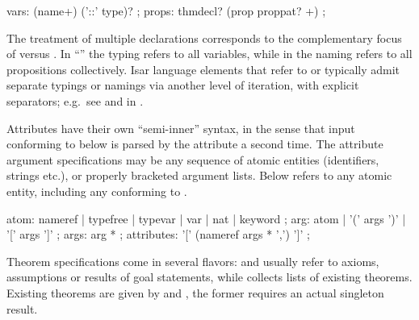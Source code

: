 \begin{isabellebody}
\begin{isamarkuptext}
  \begin{rail}
    vars: (name+) ('::' type)?
    ;
    props: thmdecl? (prop proppat? +)
    ;
  \end{rail}

  The treatment of multiple declarations corresponds to the
  complementary focus of  versus
  .  In ``''
  the typing refers to all variables, while in  the naming refers to all propositions collectively.
  Isar language elements that refer to  or
   typically admit separate typings or namings via
  another level of iteration, with explicit \hyperlink{keyword.and}{\mbox{}}
  separators; e.g.\ see \hyperlink{command.fix}{\mbox{}} and \hyperlink{command.assume}{\mbox{}} in
  .%
\end{isamarkuptext}%
\isamarkuptrue%
%
\isamarkuptrue%
%
\begin{isamarkuptext}%
Attributes have their own ``semi-inner'' syntax, in the sense
  that input conforming to  below is parsed by the
  attribute a second time.  The attribute argument specifications may
  be any sequence of atomic entities (identifiers, strings etc.), or
  properly bracketed argument lists.  Below  refers to
  any atomic entity, including any  conforming to
  .

  \begin{rail}
    atom: nameref | typefree | typevar | var | nat | keyword
    ;
    arg: atom | '(' args ')' | '[' args ']'
    ;
    args: arg *
    ;
    attributes: '[' (nameref args * ',') ']'
    ;
  \end{rail}

  Theorem specifications come in several flavors:
   and  usually refer to
  axioms, assumptions or results of goal statements, while
   collects lists of existing theorems.  Existing
  theorems are given by  and
  , the former requires an actual singleton
  result.


\end{isamarkuptext}
\end{isabellebody}
